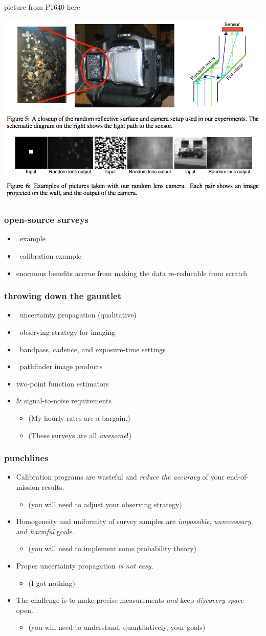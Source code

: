 \documentclass[pdftex]{beamer}
\newcommand{\conclusionslide}{
\begin{frame}
  \frametitle{punchlines}
  \begin{itemize}
  \item Calibration programs are wasteful and \emph{reduce the accuracy} of your end-of-mission results.
    \begin{itemize}
    \item (you will need to adjust your observing strategy)
    \end{itemize}
  \item Homogeneity and uniformity of survey samples are \emph{impossible}, \emph{unnecessary}, and \emph{harmful} goals.
    \begin{itemize}
    \item (you will need to implement some probability theory)
    \end{itemize}
  \item Proper uncertainty propagation \emph{is not easy}.
    \begin{itemize}
    \item (I got nothing)
    \end{itemize}
  \item The challenge is to make precise measurements \emph{and} keep \emph{discovery space} open.
    \begin{itemize}
    \item (you will need to understand, quantitatively, your goals)
    \end{itemize}
  \end{itemize}
\end{frame}
}
\begin{document}
\begin{frame}
picture from P1640 here
\end{frame}

\begin{frame}
\includegraphics[width=\textwidth]{fergus.png}
\end{frame}

\begin{frame}
  \frametitle{open-source surveys}
  \begin{itemize}
  \item \hipparcos\ example
  \item \sdss\ calibration example
  \item enormous benefits accrue from making the data re-reducable from scratch
  \end{itemize}
\end{frame}

\begin{frame}
  \frametitle{throwing down the gauntlet}
  \begin{itemize}
  \item \gaia\ uncertainty propagation (qualitative)
  \item \euclid\ observing strategy for imaging
  \item \lsst\ bandpass, cadence, and exposure-time settings
  \item \ska\ pathfinder image products
  \item {} two-point function estimators
  \item {} \&  signal-to-noise requirements
    \begin{itemize}
    \item (My hourly rates are a bargain.)
    \item (These surveys are all \emph{awesome}!)
    \end{itemize}
  \end{itemize}
\end{frame}

\conclusionslide
\end{document}
